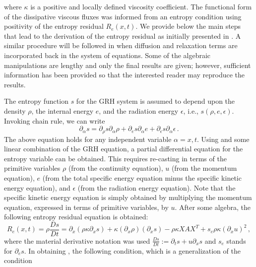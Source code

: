 \documentclass[times,doublespace]{fldauth}%
\begin{document}
%
where $\kappa$ is a positive and locally defined viscosity coefficient.
The functional form of the dissipative viscous fluxes was informed from an entropy condition using positivity of the 
entropy residual $R_e(x,t)$. We provide below the main steps that lead to the derivation of the entropy residual as 
initially presented in \cite{our_jcp_radhy_paper}. A similar procedure will be followed in  when 
diffusion and relaxation terms are incorporated back in the system of equations. Some of the algebraic manipulations 
are lengthy and only the final results are given; however, sufficient information has been provided so that 
the interested reader may reproduce the results. 

The entropy function $s$ for the GRH system is assumed to depend upon the density $\rho$, the internal energy $e$, and the radiation energy $\epsilon$, i.e., $s( \rho, e, \epsilon)$. Invoking chain rule, we can write
%
\begin{equation}
\label{eq:chain_rule_entropy}
\partial_{\alpha} s = \partial_{\rho} s \partial_{\alpha} \rho +  \partial_{e} s \partial_{\alpha}e +  \partial_{\epsilon} s \partial_{\alpha} \epsilon \,.
\end{equation}
The above equation holds for any independent variable $\alpha=x,t$. Using  and some linear
combination of the GRH equation, a partial differential equation for the entropy variable can be obtained. This requires
re-casting   in terms of the primitive variables $\rho$ (from  the continuity 
equation), $u$  (from  the momentum equation), $e$ (from the total specific energy equation minus the specific 
kinetic energy equation), and $\epsilon$ (from the radiation energy equation). Note that 
the specific kinetic energy equation is simply obtained by multiplying the momentum equation, expressed in terms of primitive variables, by $u$. After some algebra, the following entropy residual equation is obtained:
%
\begin{equation} 
\label{eq:app_entr_eq_non_equil}
R_e(x,t) = \rho \frac{Ds}{Dt} = \partial_x \left( \rho \kappa \partial_x s \right) + \kappa \left(\partial_x \rho\right) \left( \partial_x s\right) - \rho \kappa X A X^T  + s_e \rho \kappa (\partial_x u)^2 \, ,
\end{equation} 
% 
where the material derivative notation was used $\frac{Ds}{Dt} := \partial_t s + u \partial_x s$ and
$s_e$ stands for $\partial_e s$. 
In obtaining , the following condition, which is a generalization of the condition
\end{document}
